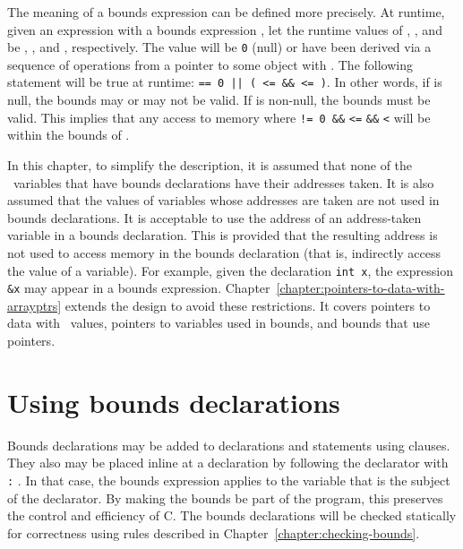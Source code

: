 The meaning of a bounds expression can be defined more precisely. At
runtime, given an expression  with a bounds expression
, let the runtime
values of , , and  be , ,
and , respectively. The value  will be \texttt{0} (null) or
have been derived via a sequence of operations from a pointer to some
object  with .
The following statement will be true at runtime:
 \texttt{== 0 || ( <= \&\& 
 <= )}. In other words, 
if  is null, the bounds
may or may not be valid. If  is non-null, the bounds must be
valid. This implies that any access to memory where  \texttt{!=
0 \&\&}  \texttt{<=}  \texttt{\&\&} 
\texttt{<}  will be within the bounds of .

In this chapter, to simplify the description, it is assumed that none of
the \arrayptr\ variables that have bounds declarations have
their addresses taken. It is also assumed that the values of variables
whose addresses are taken are not used in bounds declarations. It is
acceptable to use the address of an address-taken variable in a bounds
declaration. This is provided that the resulting address is not used to
access memory in the bounds declaration (that is, indirectly access the
value of a variable). For example, given the declaration \texttt{int x},
the expression \texttt{\&x} may appear in a bounds expression.  
Chapter~\ref{chapter:pointers-to-data-with-arrayptrs} extends the
design to avoid these restrictions.  It covers pointers to data with 
\arrayptr\ values,  pointers to variables used in bounds, and bounds 
that use pointers.

\section{Using bounds declarations}

Bounds declarations may be added to declarations and statements using
 clauses. They also may be placed inline at a declaration
by following the declarator with \texttt{:} . In that
case, the bounds expression applies to the variable that is the subject
of the declarator. By making the bounds be part of the program, this
preserves the control and efficiency of C. The bounds declarations will
be checked statically for correctness using rules described in 
Chapter~\ref{chapter:checking-bounds}.

